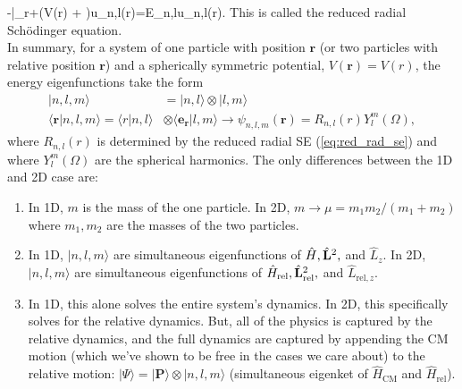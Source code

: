 \be
	-\bigg|_{r}+\left(V(r) + \right)u_{n,l}(r)=E_{n,l}u_{n,l}(r)\label{eq:red_rad_se}.
\ee
This is called the reduced radial Sch{\"o}dinger equation.\\

In summary, for a system of one particle with position $\mathbf{r}$ (or two particles with relative position $\mathbf{r}$) and a spherically symmetric potential, $V(\mathbf{r})=V(r)$, the energy eigenfunctions take the form
\begin{align*}
    |n,l,m\rangle&=|n,l\rangle\otimes|l,m\rangle\\
    \langle\mathbf{r}|n,l,m\rangle = \langle r|n,l\rangle&\otimes \langle \mathbf{e}_\mathbf{r}|l,m\rangle\rightarrow \psi_{n,l,m}(\mathbf{r})=R_{n,l}(r)Y^m_l(\Omega),
\end{align*}
where $R_{n,l}(r)$ is determined by the reduced radial SE (\cref{eq:red_rad_se}) and where $Y^m_l(\Omega)$ are the spherical harmonics. The only differences between the 1D and 2D case are:
\begin{enumerate}
    \item In 1D, $m$ is the mass of the one particle. In 2D, $m\rightarrow\mu=m_1m_2/(m_1+m_2)$ where $m_1, m_2$ are the masses of the two particles.
    \item In 1D, $|n,l,m\rangle$ are simultaneous eigenfunctions of $\hat{H},\hat{\mathbf{L}}^2,$ and $\hat{L}_z$. In 2D, $|n,l,m\rangle$ are simultaneous eigenfunctions of $\hat{H}_\text{rel},\hat{\mathbf{L}}^2_\text{rel},$ and $\hat{L}_{\text{rel},z}$.
    \item In 1D, this alone solves the entire system's dynamics. In 2D, this specifically solves for the relative dynamics. But, all of the physics is captured by the relative dynamics, and the full dynamics are captured by appending the CM motion (which we've shown to be free in the cases we care about) to the relative motion: $|\Psi\rangle=|\mathbf{P}\rangle\otimes|n,l,m\rangle$ (simultaneous eigenket of $\hat{H}_\text{CM}$ and $\hat{H}_\text{rel}$).
\end{enumerate}